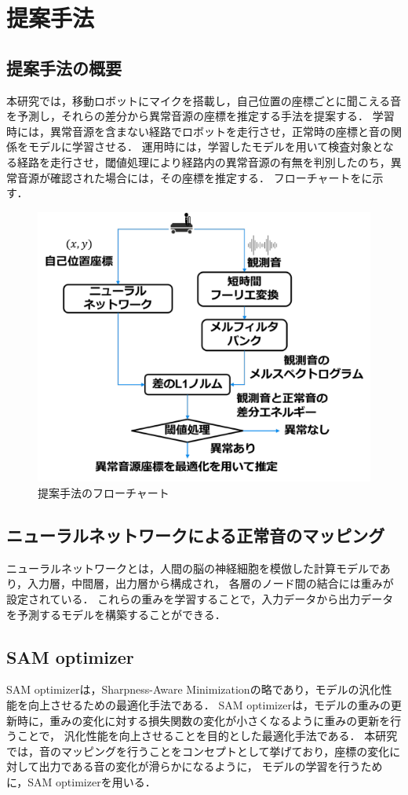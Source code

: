 \documentclass[../main]{subfiles}
\begin{document}
\graphicspath{{../figures/}}

\section{提案手法}





\subsection{提案手法の概要}
本研究では，移動ロボットにマイクを搭載し，自己位置の座標ごとに聞こえる音を予測し，それらの差分から異常音源の座標を推定する手法を提案する．
学習時には，異常音源を含まない経路でロボットを走行させ，正常時の座標と音の関係をモデルに学習させる．
運用時には，学習したモデルを用いて検査対象となる経路を走行させ，閾値処理により経路内の異常音源の有無を判別したのち，異常音源が確認された場合には，その座標を推定する．
フローチャートをに示す．
\begin{figure}[tb]
  \centering
  \includegraphics[keepaspectratio, width=0.8\linewidth]{flowchart.pdf}
  \caption{提案手法のフローチャート}
\end{figure}
\subsection{ニューラルネットワークによる正常音のマッピング}
ニューラルネットワークとは，人間の脳の神経細胞を模倣した計算モデルであり，入力層，中間層，出力層から構成され，
各層のノード間の結合には重みが設定されている．
これらの重みを学習することで，入力データから出力データを予測するモデルを構築することができる．
\subsection{SAM optimizer}
SAM optimizerは，Sharpness-Aware Minimizationの略であり，モデルの汎化性能を向上させるための最適化手法である．
SAM optimizerは，モデルの重みの更新時に，重みの変化に対する損失関数の変化が小さくなるように重みの更新を行うことで，
汎化性能を向上させることを目的とした最適化手法である．
本研究では，音のマッピングを行うことをコンセプトとして挙げており，座標の変化に対して出力である音の変化が滑らかになるように，
モデルの学習を行うために，SAM optimizerを用いる．
\end{document}
